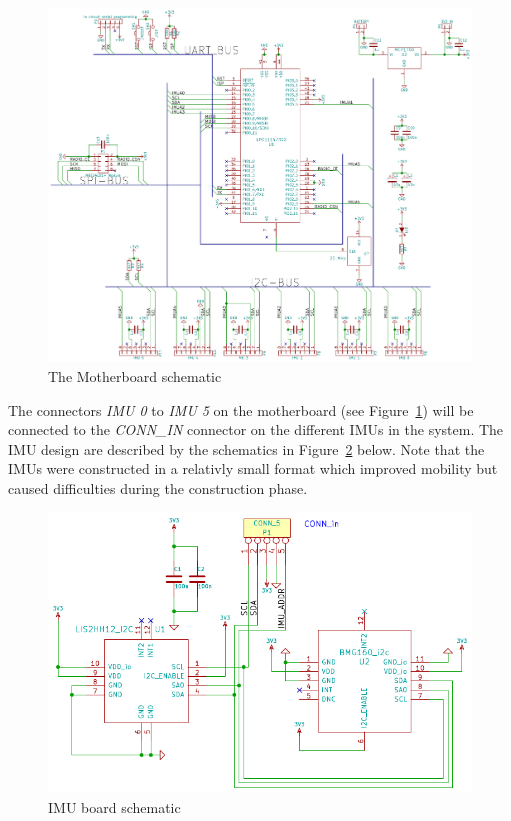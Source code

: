 \documentclass[a4paper, 12pt]{article}
\begin{document}
\begin{figure}[h!] %
    \centering
    \includegraphics[scale=0.67]{mb_schematic.pdf}
    \caption{The Motherboard schematic}
    \label{fig:pic5}
\end{figure}

\noindent %
The connectors \textit{IMU 0} to \textit{IMU 5} on the motherboard (see Figure~\ref{fig:pic5}) will be connected to the \textit{CONN\_IN} connector on the different IMUs in the system. The IMU design are described by the schematics in Figure~\ref{fig:pic6} below. Note that the IMUs were constructed in a relativly small format which improved mobility but caused difficulties during the construction phase. %
 
\begin{figure}[h!]%
    \centering
    \includegraphics{imu_schematic.pdf}
    \caption{IMU board schematic}
    \label{fig:pic6}
\end{figure}
\end{document}
